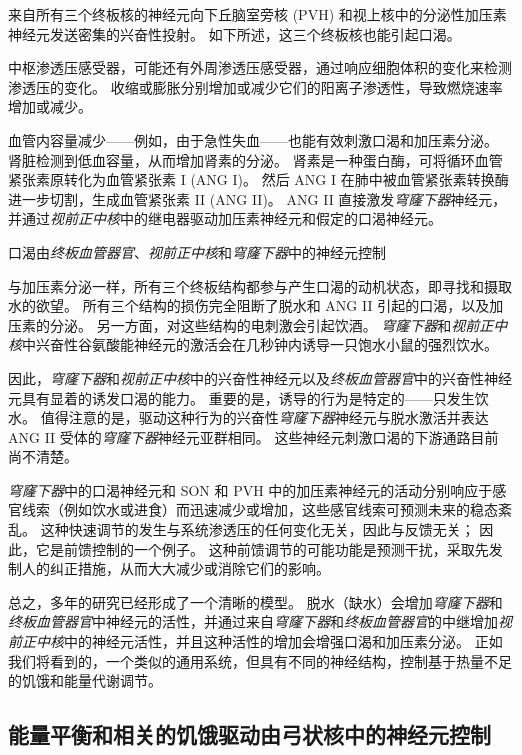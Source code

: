 来自所有三个终板核的神经元向下丘脑室旁核 (PVH) 和视上核中的分泌性加压素神经元发送密集的兴奋性投射。
如下所述，这三个终板核也能引起口渴。


中枢渗透压感受器，可能还有外周渗透压感受器，通过响应细胞体积的变化来检测渗透压的变化。
收缩或膨胀分别增加或减少它们的阳离子渗透性，导致燃烧速率增加或减少。


血管内容量减少——例如，由于急性失血——也能有效刺激口渴和加压素分泌。
肾脏检测到低血容量，从而增加肾素的分泌。
肾素是一种蛋白酶，可将循环血管紧张素原转化为血管紧张素 I (ANG I)。
然后 ANG I 在肺中被血管紧张素转换酶进一步切割，生成血管紧张素 II (ANG II)。
ANG II 直接激发\textit{穹窿下器}神经元，并通过\textit{视前正中核}中的继电器驱动加压素神经元和假定的口渴神经元。


口渴由\textit{终板血管器官}、\textit{视前正中核}和\textit{穹窿下器}中的神经元控制

与加压素分泌一样，所有三个终板结构都参与产生口渴的动机状态，即寻找和摄取水的欲望。
所有三个结构的损伤完全阻断了脱水和 ANG II 引起的口渴，以及加压素的分泌。 另一方面，对这些结构的电刺激会引起饮酒。
\textit{穹窿下器}和\textit{视前正中核}中兴奋性谷氨酸能神经元的激活会在几秒钟内诱导一只饱水小鼠的强烈饮水。


因此，\textit{穹窿下器}和\textit{视前正中核}中的兴奋性神经元以及\textit{终板血管器官}中的兴奋性神经元具有显着的诱发口渴的能力。
重要的是，诱导的行为是特定的——只发生饮水。
值得注意的是，驱动这种行为的兴奋性\textit{穹窿下器}神经元与脱水激活并表达 ANG II 受体的\textit{穹窿下器}神经元亚群相同。
这些神经元刺激口渴的下游通路目前尚不清楚。


\textit{穹窿下器}中的口渴神经元和 SON 和 PVH 中的加压素神经元的活动分别响应于感官线索（例如饮水或进食）而迅速减少或增加，这些感官线索可预测未来的稳态紊乱。
这种快速调节的发生与系统渗透压的任何变化无关，因此与反馈无关；
因此，它是前馈控制的一个例子。
这种前馈调节的可能功能是预测干扰，采取先发制人的纠正措施，从而大大减少或消除它们的影响。


总之，多年的研究已经形成了一个清晰的模型。
脱水（缺水）会增加\textit{穹窿下器}和\textit{终板血管器官}中神经元的活性，并通过来自\textit{穹窿下器}和\textit{终板血管器官}的中继增加\textit{视前正中核}中的神经元活性，并且这种活性的增加会增强口渴和加压素分泌。
正如我们将看到的，一个类似的通用系统，但具有不同的神经结构，控制基于热量不足的饥饿和能量代谢调节。



\subsection{能量平衡和相关的饥饿驱动由弓状核中的神经元控制}

